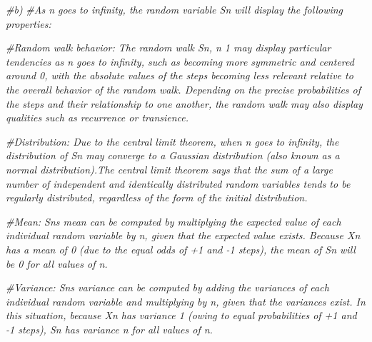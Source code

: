 \documentclass[
]{article}
\newenvironment{Shaded}{\begin{snugshade}}{\end{snugshade}}
\newcommand{\CommentTok}[1]{\textcolor[rgb]{0.56,0.35,0.01}{\textit{#1}}}
\begin{document}
\begin{Shaded}
\begin{Highlighting}[]
\CommentTok{\#b)}
\CommentTok{\#As n goes to infinity, the random variable Sn will display the following properties:}

\CommentTok{\#Random walk behavior: The random walk Sn, n 1 may display particular tendencies as n goes to infinity, such as becoming more symmetric and centered around 0, with the absolute values of the steps becoming less relevant relative to the overall behavior of the random walk. Depending on the precise probabilities of the steps and their relationship to one another, the random walk may also display qualities such as recurrence or transience.}

\CommentTok{\#Distribution: Due to the central limit theorem, when n goes to infinity, the distribution of Sn may converge to a Gaussian distribution (also known as a normal distribution).The central limit theorem says that the sum of a large number of independent and identically distributed random variables tends to be regularly distributed, regardless of the form of the initial distribution.}

\CommentTok{\#Mean: Sn\textquotesingle{}s mean can be computed by multiplying the expected value of each individual random variable by n, given that the expected value exists. Because Xn has a mean of 0 (due to the equal odds of +1 and {-}1 steps), the mean of Sn will be 0 for all values of n.}

\CommentTok{\#Variance: Sn\textquotesingle{}s variance can be computed by adding the variances of each individual random variable and multiplying by n, given that the variances exist. In this situation, because Xn has variance 1 (owing to equal probabilities of +1 and {-}1 steps), Sn has variance n for all values of n.}
\end{Highlighting}
\end{Shaded}
\end{document}
